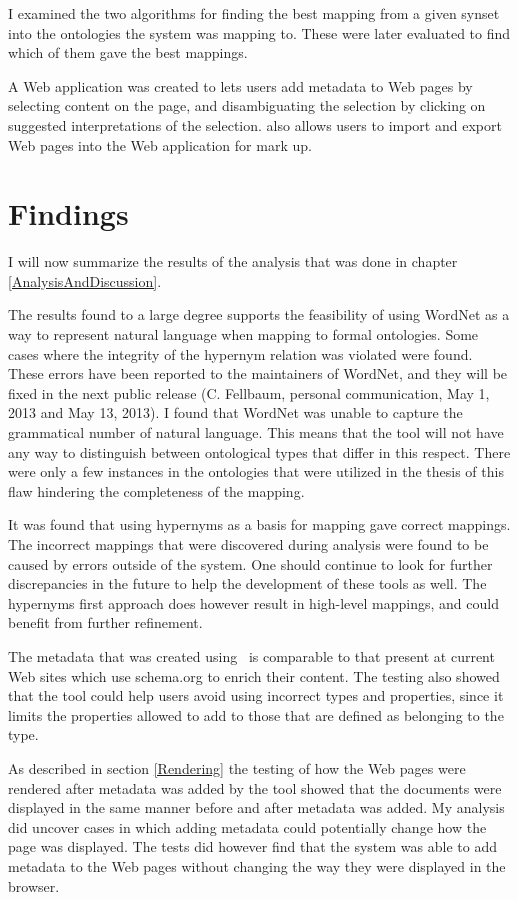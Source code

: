 I examined the two algorithms for finding the best mapping from a given synset into the ontologies the system was mapping to.
These were later evaluated to find which of them gave the best mappings.

A Web application was created to lets users add metadata to Web pages by selecting content on the page,
and disambiguating the selection by clicking on suggested interpretations of the selection.
\Theartefact also allows users to import and export Web pages into the Web application for mark up.

\section{Findings}
I will now summarize the results of the analysis that was done in chapter \ref{AnalysisAndDiscussion}.

The results found to a large degree supports the feasibility of using WordNet as a way to represent natural language
when mapping to formal ontologies.
Some cases where the integrity of the hypernym relation was violated were found.
These errors have been reported to the maintainers of WordNet, and they will be fixed in the next public  release (C. Fellbaum, personal communication, May 1, 2013 and May 13, 2013).
I found that WordNet was unable to capture the grammatical number of natural language.
This means that the tool will not have any way to distinguish between ontological types that differ in this respect.
There were only a few instances in the ontologies that were utilized in the thesis of this flaw hindering the completeness of the mapping.

It was found that using hypernyms as a basis for mapping gave correct mappings.
The incorrect mappings that were discovered during analysis were found to be caused by errors outside of the system.
One should continue to look for further discrepancies in the future to help the development of these tools as well.
The hypernyms first approach does however result in high-level mappings, and could benefit from further refinement.

The metadata that was created using \theartefact\ is comparable to that present at current Web sites which use schema.org to
enrich their content.
The testing also showed that the tool could help users avoid using incorrect types and properties,
since it limits the properties allowed to add to those that are defined as belonging to the type.

As described in section \ref{Rendering} the testing of how the Web pages were rendered after metadata was added by the tool
showed that the documents were displayed in the same manner before and after metadata was added.
My analysis did uncover cases in which adding metadata could potentially change how the page was displayed.
The tests did however find that the system was able to add metadata to the Web pages without changing the way they were displayed in the browser.


